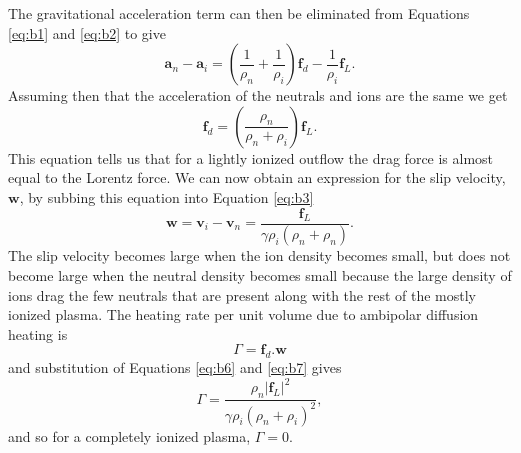The gravitational acceleration term can then be eliminated from Equations \ref{eq:b1} and \ref{eq:b2} to give
\begin{equation}
\pmb{a} _{n} - \pmb{a} _{i} = \left(\frac{1}{\rho _{n}}+ \frac{1}{\rho _{i}} \right)\pmb{f} _{d}-\frac{1}{\rho _{i}}\pmb{f} _{L}.
\end{equation}
Assuming then that the acceleration of the neutrals and ions are the same we get
\begin{equation}\label{eq:b6}
\pmb{f} _{d} =  \left(\frac{\rho _{n}}{\rho _{n}+\rho _{i}} \right)\pmb{f} _{L}.
\end{equation}
This equation tells us that for a lightly ionized outflow the drag force is almost equal to the Lorentz force. We can now obtain an expression for the slip velocity, $\pmb{w}$, by subbing this equation into Equation \ref{eq:b3}
\begin{equation}\label{eq:b7}
\pmb{w} = \pmb{v} _{i} - \pmb{v} _{n} = \frac{\pmb{f} _{L}}{\gamma \rho _{i}(\rho _{n} + \rho _{n})}.
\end{equation}
The slip velocity becomes large when the ion density becomes small, but does not become large when the neutral density becomes small because the large density of ions drag the few neutrals that are present along with the rest of the mostly ionized plasma. The heating rate per unit volume due to ambipolar diffusion heating is
\begin{equation}
\Gamma =\pmb{f} _{d}.\pmb{w}
\end{equation}
and substitution of Equations \ref{eq:b6} and \ref{eq:b7} gives
\begin{equation}
\Gamma =\frac{\rho _{n}|\pmb{f} _{L}|^2}{\gamma \rho _{i}(\rho _{n} + \rho _{i})^2},
\end{equation}
and so for a completely ionized plasma, $\Gamma =0$.

